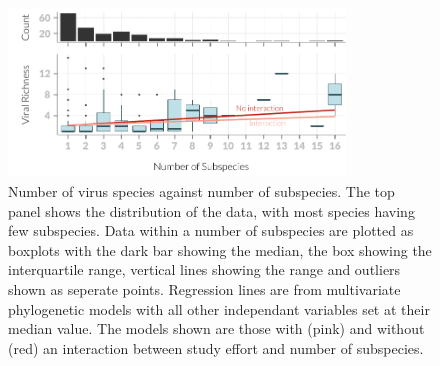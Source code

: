 \begin{knitrout}\footnotesize
{}\color{fgcolor}\begin{figure}[t]

{\centering \includegraphics[width=0.8\textwidth]{figure/boxplot-1} 

}

\caption[Number of virus species against number of subspecies]{Number of virus species against number of subspecies. 
The top panel shows the distribution of the data, with most species having few subspecies.
Data within a number of subspecies are plotted as boxplots with the dark bar showing the median, the box showing the interquartile range, vertical lines showing the range and outliers shown as seperate points.
Regression lines are from multivariate phylogenetic models with all other independant variables set at their median value.
The models shown are those with (pink) and without (red) an interaction between study effort and number of subspecies.
}\label{fig:boxplot}
\end{figure}


\end{knitrout}

















\clearpage
































